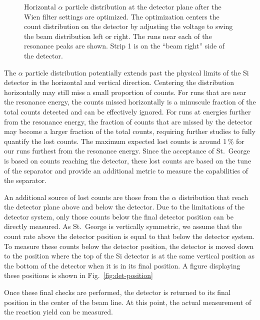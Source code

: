 \begin{figure}
\begin{center}
{        }
        \caption[Horizontal $\alpha$ particle distribution]{Horizontal
            $\alpha$ particle distribution at the detector plane after
            the Wien filter settings are optimized. The optimization
            centers the count distribution on the detector by adjusting
            the voltage to swing the beam distribution left or right.
            The runs near each of the resonance peaks are shown. Strip 1
            is on the ``beam right'' side of the detector.}
        \label{fig:alpha-distribution-strips}
    \end{center}
\end{figure}

\newpage
The $\alpha$ particle distribution potentially extends past the physical
limits of the Si detector in the horizontal and vertical direction.
Centering the distribution horizontally may still miss a small
proportion of counts. For runs that are near the resonance energy, the
counts missed horizontally is a minuscule fraction of the total counts
detected and can be effectively ignored. For runs at energies further
from the resonance energy, the fraction of counts that are missed by the
detector may become a larger fraction of the total counts, requiring
further studies to fully quantify the lost counts. The maximum expected
lost counts is around 1\,\% for our runs furthest from the resonance
energy. Since the acceptance of St.\ George is based on counts reaching
the detector, these lost counts are based on the tune of the separator
and provide an additional metric to measure the capabilities of the
separator.

An additional source of lost counts are those from the $\alpha$
distribution that reach the detector plane above and below the detector.
Due to the limitations of the detector system, only those counts below
the final detector position can be directly measured. As St.\ George is
vertically symmetric, we assume that the count rate above the detector
position is equal to that below the detector system. To measure these
counts below the detector position, the detector is moved down to the
position where the top of the Si detector is at the same vertical
position as the bottom of the detector when it is in its final position.
A figure displaying these positions is shown in
Fig.~\ref{fig:det-position}

Once these final checks are performed, the detector is returned to its
final position in the center of the beam line. At this point, the actual
measurement of the reaction yield can be measured.

